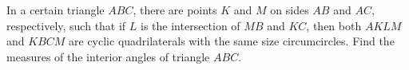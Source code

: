 In a certain triangle $ABC$, there are points $K$ and $M$ on sides $AB$ and $AC$, respectively, such that if $L$ is the intersection of $MB$ and $KC$, then both $AKLM$ and $KBCM$ are cyclic quadrilaterals with the same size circumcircles. Find the measures of the interior angles of triangle $ABC$.